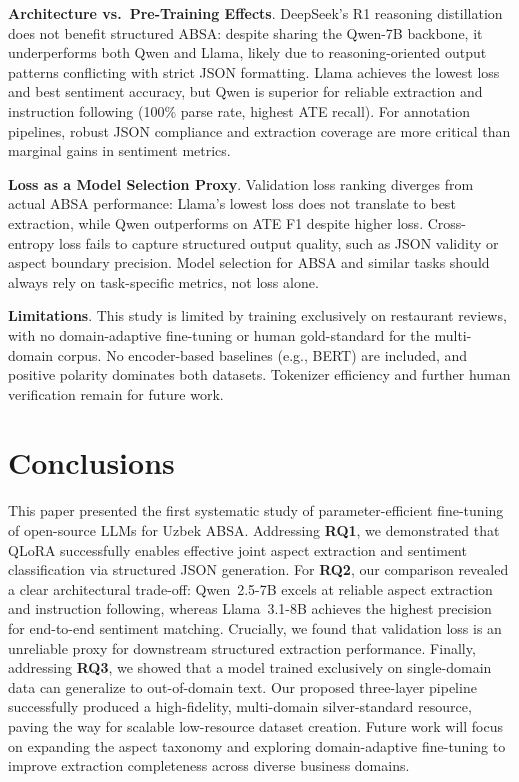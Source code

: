 \documentclass[computers,article,submit,pdftex,moreauthors]{Definitions/mdpi}
\begin{document}
\textbf{Architecture vs.\ Pre-Training Effects}. DeepSeek's R1 reasoning distillation does not benefit structured ABSA: despite sharing the Qwen-7B backbone, it underperforms both Qwen and Llama, likely due to reasoning-oriented output patterns conflicting with strict JSON formatting. Llama achieves the lowest loss and best sentiment accuracy, but Qwen is superior for reliable extraction and instruction following (100\% parse rate, highest ATE recall). For annotation pipelines, robust JSON compliance and extraction coverage are more critical than marginal gains in sentiment metrics.

\textbf{Loss as a Model Selection Proxy}. Validation loss ranking diverges from actual ABSA performance: Llama's lowest loss does not translate to best extraction, while Qwen outperforms on ATE F1 despite higher loss. Cross-entropy loss fails to capture structured output quality, such as JSON validity or aspect boundary precision. Model selection for ABSA and similar tasks should always rely on task-specific metrics, not loss alone.

\textbf{Limitations}. This study is limited by training exclusively on restaurant reviews, with no domain-adaptive fine-tuning or human gold-standard for the multi-domain corpus. No encoder-based baselines (e.g., BERT) are included, and positive polarity dominates both datasets. Tokenizer efficiency and further human verification remain for future work.



\section{Conclusions}
\label{sec:conclusion}
This paper presented the first systematic study of parameter-efficient fine-tuning of open-source LLMs for Uzbek ABSA. Addressing \textbf{RQ1}, we demonstrated that QLoRA successfully enables effective joint aspect extraction and sentiment classification via structured JSON generation. For \textbf{RQ2}, our comparison revealed a clear architectural trade-off: Qwen~2.5-7B excels at reliable aspect extraction and instruction following, whereas Llama~3.1-8B achieves the highest precision for end-to-end sentiment matching. Crucially, we found that validation loss is an unreliable proxy for downstream structured extraction performance. Finally, addressing \textbf{RQ3}, we showed that a model trained exclusively on single-domain data can generalize to out-of-domain text. Our proposed three-layer pipeline successfully produced a high-fidelity, multi-domain silver-standard resource, paving the way for scalable low-resource dataset creation. Future work will focus on expanding the aspect taxonomy and exploring domain-adaptive fine-tuning to improve extraction completeness across diverse business domains.
\vspace{6pt} 
\end{document}
